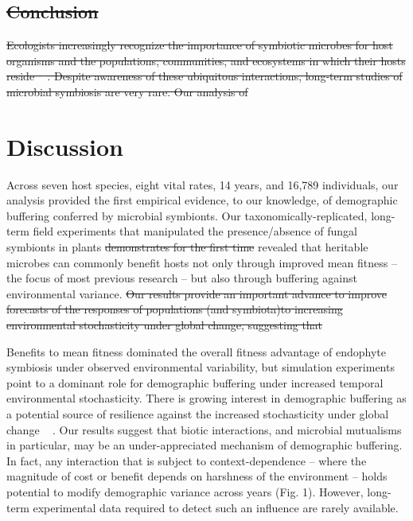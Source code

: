 \documentclass[lineno,sn-nature]{sn-jnl}%
\providecommand{\DIFadd}[1]{{\protect\color{blue}#1}} %
\providecommand{\DIFdel}[1]{{\protect\color{red}\protect\scriptsize\sout{#1}}}
\providecommand{\DIFadd}[1]{{\protect\color{blue}\uwave{#1}}} %
\providecommand{\DIFdel}[1]{{\protect\color{red}\sout{#1}}}                      %
\providecommand{\DIFaddbegin}{} %
\providecommand{\DIFaddend}{} %
\providecommand{\DIFdelbegin}{} %
\providecommand{\DIFdelend}{} %
\newcommand{\DIFscaledelfig}{0.5}
\newlength{\DIFdelgraphicswidth} %
\newlength{\DIFdelgraphicsheight} %
\newcommand{\DIFaddincludegraphics}[2][]{{\color{blue}\fbox{\DIFOincludegraphics[#1]{#2}}}} %
\newcommand{\DIFdelincludegraphics}[2][]{%
\sbox{\DIFdelgraphicsbox}{\DIFOincludegraphics[#1]{#2}}%
\settoboxwidth{\DIFdelgraphicswidth}{\DIFdelgraphicsbox} %
\settoboxtotalheight{\DIFdelgraphicsheight}{\DIFdelgraphicsbox} %
\scalebox{\DIFscaledelfig}{%
\parbox[b]{\DIFdelgraphicswidth}{\usebox{\DIFdelgraphicsbox}\\[-\baselineskip] \rule{\DIFdelgraphicswidth}{0em}}\llap{\resizebox{\DIFdelgraphicswidth}{\DIFdelgraphicsheight}{%
\setlength{\unitlength}{\DIFdelgraphicswidth}%
\begin{picture}(1,1)%
\thicklines\linethickness{2pt} %
{\color[rgb]{1,0,0}\put(0,0){\framebox(1,1){}}}%
{\color[rgb]{1,0,0}\put(0,0){\line( 1,1){1}}}%
{\color[rgb]{1,0,0}\put(0,1){\line(1,-1){1}}}%
\end{picture}%
}\hspace*{3pt}}} %
} %
\DeclareRobustCommand{\DIFaddbegin}{\DIFOaddbegin \let\includegraphics\DIFaddincludegraphics} %
\DeclareRobustCommand{\DIFaddend}{\DIFOaddend \let\includegraphics\DIFOincludegraphics} %
\DeclareRobustCommand{\DIFdelbegin}{\DIFOdelbegin \let\includegraphics\DIFdelincludegraphics} %
\DeclareRobustCommand{\DIFdelend}{\DIFOaddend \let\includegraphics\DIFOincludegraphics} %
\begin{document}
\DIFdelbegin \subsection*{\DIFdel{Conclusion}}
\DIFdel{Ecologists increasingly recognize the importance of symbiotic microbes for host organisms and the populations, communities, and ecosystems in which their hosts reside \mbox{%
\cite{afkhami2016native,smith2017symbiont,dallas2022captivity,wu2022reduction}}\hspace{0pt}%
.
Despite awareness of these ubiquitous interactions, long-term studies of microbial symbiosis are very rare. 
Our analysis of }\DIFdelend \DIFaddbegin \section*{\DIFadd{Discussion}}
\DIFadd{Across seven host species, eight vital rates, 14 years, and 16,789 individuals, our analysis provided the first empirical evidence, to our knowledge, of demographic buffering conferred by microbial symbionts. 
Our }\DIFaddend taxonomically-replicated, long-term field experiments that manipulated the presence/absence of fungal symbionts in plants \DIFdelbegin \DIFdel{demonstrates for the first time }\DIFdelend \DIFaddbegin \DIFadd{revealed }\DIFaddend that heritable microbes can commonly benefit hosts not only through improved mean fitness -- the focus of most previous research -- but also through buffering against environmental variance. 
\DIFdelbegin \DIFdel{Our results provide an important advance to improve forecasts of the responses of populations (and symbiota)to increasing environmental stochasticity under global change, suggesting that }\DIFdelend \DIFaddbegin \DIFadd{Benefits to mean fitness dominated the overall fitness advantage of endophyte symbiosis under observed environmental variability, but simulation experiments point to a dominant role for demographic buffering under increased temporal environmental stochasticity. 
There is growing interest in demographic buffering as a potential source of resilience against the increased stochasticity under global change \mbox{%
\cite{hilde_demographic_2020}}\hspace{0pt}%
. 
Our results suggest that biotic interactions, and microbial mutualisms in particular, may be an under-appreciated mechanism of demographic buffering. 
In fact, any interaction that is subject to context-dependence -- where the magnitude of cost or benefit depends on harshness of the environment -- holds potential to modify demographic variance across years (Fig. 1). 
However, long-term experimental data required to detect such an influence are rarely available. 

}
\end{document}
